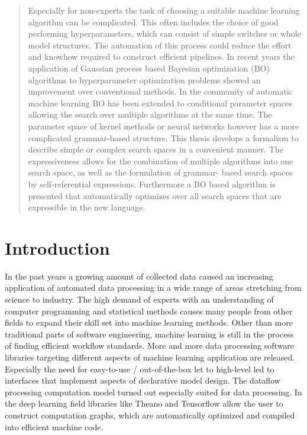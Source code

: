 \documentclass[english]{article}
\begin{document}
\begin{abstract}
Especially for non-experts the task of choosing a suitable machine learning algorithm can be complicated. This often includes the choice of good performing hyperparameters, which can consist of simple switches or whole model structures. The automation of this process could reduce the effort and knowhow required to construct efficient pipelines. In recent years the application of Gaussian process based Bayesian optimization (BO) algorithms to hyperparameter optimization problems showed an improvement over conventional methods. In the community of automatic machine learning BO has been extended to conditional parameter spaces allowing the search over multiple algorithms at the same time. The parameter space of kernel methods or neural networks however has a more complicated grammar-based structure. This thesis develops a formalism to describe simple or complex search spaces in a convenient manner. The expressiveness allows for the combination of multiple algorithms into one search space, as well as the formulation of grammar- based search spaces by self-referential expressions. Furthermore a BO based algorithm is presented that automatically optimizes over all search spaces that are expressible in the new language.
\end{abstract}



\section{Introduction}
In the past years a growing amount of collected data caused an increasing application of automated data processing in a wide range of areas stretching from  science to industry.
The high demand of experts with an understanding of computer programming and statistical methods causes many people from other fields to expand their skill set into machine learning methods. Other than more traditional parts of software engineering, machine learning is still in the process of finding efficient workflow standards. More and more data processing software libraries targeting different aspects of machine learning application are released. Especially the need for easy-to-use / out-of-the-box let to high-level led to interfaces that implement aspects of declarative model design. The dataflow processing computation model turned out especially suited for data processing. In the deep learning field libraries like Theano and Tensorflow allow the user to construct computation graphs, which are automatically optimized and compiled into efficient machine code.
\end{document}
